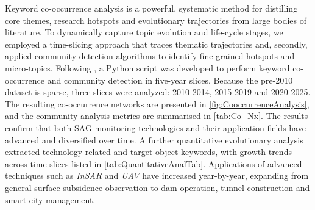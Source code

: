 \documentclass[preprint,11pt,authoryear,3p]{elsarticle}
\begin{document}
Keyword co-occurrence analysis is a powerful, systematic method for distilling core themes, research hotspots and evolutionary trajectories from large bodies of literature. To dynamically capture topic evolution and life-cycle stages, we employed a time-slicing approach that traces thematic trajectories and, secondly, applied community-detection algorithms to identify fine-grained hotspots and micro-topics. Following \citep{Lee01042010}, a Python script was developed to perform keyword co-occurrence and community detection in five-year slices. Because the pre-2010 dataset is sparse, three slices were analyzed: 2010-2014, 2015-2019 and 2020-2025. The resulting co-occurrence networks are presented in \autoref{fig:CooccurrenceAnalysis}, and the community-analysis metrics are summarised in \autoref{tab:Co_Nx}. The results confirm that both SAG monitoring technologies and their application fields have advanced and diversified over time. A further quantitative evolutionary analysis extracted technology-related and target-object keywords, with growth trends across time slices listed in \autoref{tab:QuantitativeAnalTab}. Applications of advanced techniques such as \emph{InSAR} and \emph{UAV} have increased year-by-year, expanding from general surface-subsidence observation to dam operation, tunnel construction and smart-city management.
\end{document}
